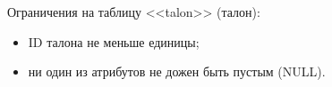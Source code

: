 Ограничения на таблицу <<talon>> (талон):

\begin{itemize}
  \item ID талона не меньше единицы;
  \item ни один из атрибутов не дожен быть пустым (NULL).
\end{itemize}
